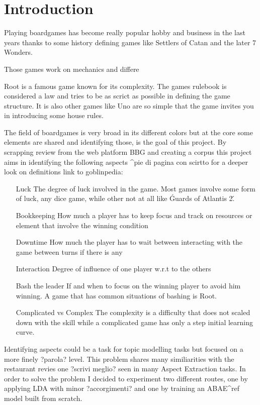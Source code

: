 \section{Introduction}

Playing boardgames has become really popular hobby and business in the last years thanks to some history defining
games like Settlers of Catan and the later 7 Wonders.

Those games work on mechanics and differe

Root is a famous game known for its complexity.
The games rulebook is considered a law and tries to be as scrict as possible in defining the game structure.
It is also other games like Uno are so simple that the game invites you in introducing some house rules.

The field of boardgames is very broad in its different colors but at the core some elements are shared and
identifying those, is the goal of this project.
By scrapping review from the web platform BBG and creating a corpus this project aims in identifying the following aspects
^pie di pagina con scirtto for a deeper look on definitions link to goblinpedia:
\begin{itemize}
    \item[Luck] The degree of luck involved in the game.
    Most games involve some form of luck, any dice game, while other not at all like \'Guards of Atlantis 2\'.
    \item[Bookkeeping] How much a player has to keep focus and track on resources or element that involve the winning condition
    \item[Downtime] How much the player has to wait between interacting with the game between turns if there is any
    \item[Interaction] Degree of influence of one player w.r.t to the others
    \item[Bash the leader] If and when to focus on the winning player to avoid him winning.
    A game that has common situations of bashing is Root.
    \item[Complicated vs Complex] The complexity is a difficulty that does not scaled down with the skill while
    a complicated game has only a step initial learning curve.
\end{itemize}

Identifying aspects could be a task for topic modelling tasks but focused on a more finely ?parola? level.
This problem shares many similiarities with the restaurant revies one ?scrivi meglio? seen in many Aspect Extraction tasks.
In order to solve the problem I decided to experiment two different routes, one by applying LDA with minor ?accorgimenti?
and one by training an ABAE^ref model built from scratch.

